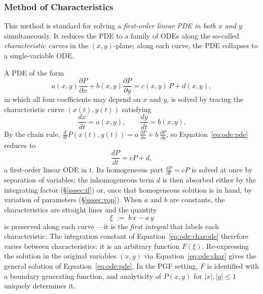 \subsubsection{Method of Characteristics}\label{sssec:moc}

This method is standard for solving a \emph{first-order linear PDE in both $x$ and $y$} simultaneously. It reduces the PDE to a family of ODEs along the so-called \emph{characteristic curves} in the $(x,y)$-plane; along each curve, the PDE collapses to a single-variable ODE.

A PDE of the form
\begin{equation}
    a(x,y) \frac{\partial P}{\partial x} + b(x,y) \frac{\partial P}{\partial y} = c(x,y)\,P + d(x,y),
    \label{eq:ode:pde}
\end{equation}
in which all four coefficients may depend on $x$ and $y$, is solved by tracing the characteristic curve $(x(t),y(t))$ satisfying
\begin{equation}
    \frac{dx}{dt} = a(x,y), \qquad \frac{dy}{dt} = b(x,y).
    \label{eq:ode:char}
\end{equation}
By the chain rule, $\frac{d}{dt}P(x(t),y(t)) = a\,\frac{\partial P}{\partial x} + b\,\frac{\partial P}{\partial y}$, so Equation~\eqref{eq:ode:pde} reduces to
\begin{equation}
    \frac{dP}{dt} = cP + d,
    \label{eq:ode:charode}
\end{equation}
a first-order linear ODE in $t$. Its homogeneous part $\frac{dP}{dt}=cP$ is solved at once by separation of variables; the inhomogeneous term $d$ is then absorbed either by the integrating factor (\S\ref{sssec:if}) or, once that homogeneous solution is in hand, by variation of parameters (\S\ref{sssec:vop}). When $a$ and $b$ are constants, the characteristics are straight lines and the quantity
\begin{equation*}
    \xi \;:=\; b\,x - a\,y
\end{equation*}
is preserved along each curve ---it is the \emph{first integral} that labels each characteristic. The integration constant of Equation~\eqref{eq:ode:charode} therefore varies between characteristics: it is an arbitrary function $F(\xi)$. Re-expressing the solution in the original variables $(x,y)$ via Equation~\eqref{eq:ode:char} gives the general solution of Equation~\eqref{eq:ode:pde}. In the PGF setting, $F$ is identified with a boundary generating function, and analyticity of $P(x,y)$ for $|x|,|y|\leq 1$ uniquely determines it.



